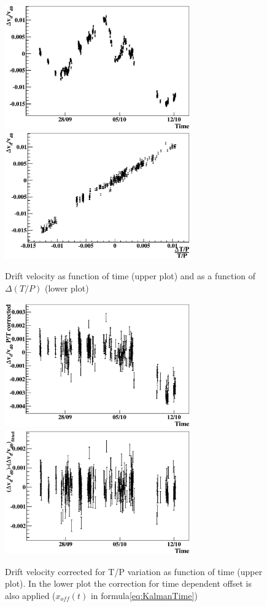 \documentclass{elsart}
\begin{document}
\begin{figure}[t]
\centering
\includegraphics[width=80mm]{picDCS/vdriftraw_time.eps}
\includegraphics[width=80mm]{picDCS/tpraw_tp.eps}
\caption{
	Drift velocity as function of time (upper plot) and as a function of $\Delta(T/P)$ (lower plot)
} 
\label{figVDrift}
\end{figure}

\begin{figure}[t]
\centering
\includegraphics[width=80mm]{picDCS/vdriftptcorr_time.eps}
\includegraphics[width=80mm]{picDCS/vdriftfdrift_time.eps}
\caption{
	Drift velocity corrected for T/P variation as function of time (upper plot). 
	In the lower plot the correction for time dependent offset is  also applied ($x_{off}(t)$ in formula\ref {eq:KalmanTime})
} 
\label{figVDriftCorrected}
\end{figure}
\end{document}
